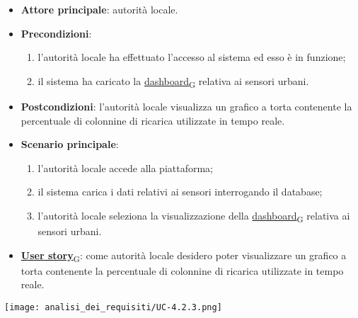 \newpage
{}
\begin{itemize}
	\item \textbf{Attore principale}: autorità locale.
	\item \textbf{Precondizioni}:
	      \begin{enumerate}
		      \item l'autorità locale ha effettuato l'accesso al sistema ed esso è in funzione;
		      \item il sistema ha caricato la \href{https://7last.github.io/docs/pb/documentazione-interna/glossario\#dashboard}{dashboard\textsubscript{G}} relativa ai sensori urbani.
	      \end{enumerate}
	\item \textbf{Postcondizioni}: l'autorità locale visualizza un grafico a torta contenente la percentuale di colonnine di ricarica utilizzate in tempo reale.
	\item \textbf{Scenario principale}:
	      \begin{enumerate}
		      \item l'autorità locale accede alla piattaforma;
		      \item il sistema carica i dati relativi ai sensori interrogando il database;
		      \item l'autorità locale seleziona la visualizzazione della \href{https://7last.github.io/docs/pb/documentazione-interna/glossario\#dashboard}{dashboard\textsubscript{G}} relativa ai sensori urbani.
	      \end{enumerate}
	\item \href{https://7last.github.io/docs/pb/documentazione-interna/glossario\#user-story}{\textbf{User story}\textsubscript{G}}:
	      come autorità locale desidero poter visualizzare un grafico a torta contenente la percentuale di colonnine di ricarica utilizzate in tempo reale.
\end{itemize}
\begin{center}
	\texttt{[image: analisi\_dei\_requisiti/UC-4.2.3.png]}
\end{center}

